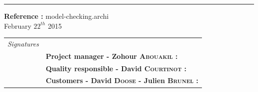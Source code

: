 \documentclass{report}
\begin{document}
\begin{titlepage}


\vspace*{4.5cm}

\noindent
\begin{minipage}{0.35\linewidth}
    \begin{flushright}
        \printauthor
    \end{flushright}
\end{minipage} \hspace{15pt}
%
\begin{minipage}{0.02\linewidth}
    \rule{1pt}{175pt}
\end{minipage} \hspace{-10pt}
%
\begin{minipage}{0.6\linewidth}
\vspace{5pt}
\newenvironment{test}{\begin{center}}{\end{center}}
\hspace{10pt}
\begin{minipage}{\linewidth} 
\textbf{Reference :} model-checking.archi ~\\
February $22^{th}$ 2015
\end{minipage}
\end{minipage}

\vspace{8cm}
\begin{minipage}{0.20\linewidth}
    \begin{flushright}
       
        \begin{tabular}{ll}
	 \textit{Signatures} & \\
			& \textbf{Project manager - Zohour \textsc{Abouakil} :} \\
            & \textbf{Quality responsible - David \textsc{Courtinot} :} \\
            & \textbf{Customers - David \textsc{Doose} - Julien \textsc{Brunel} :} \\
        \end{tabular}
    \end{flushright}
\end{minipage}

\end{titlepage}
\restoregeometry
\tableofcontents
{}
\end{document}

